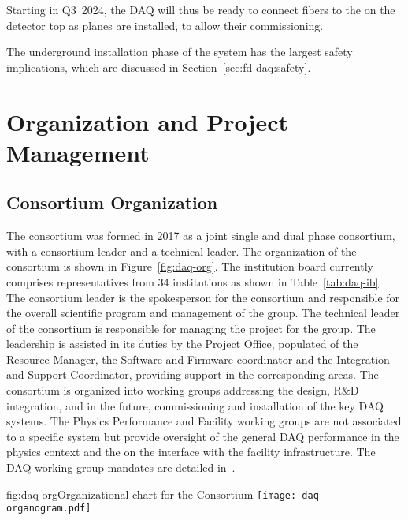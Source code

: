 Starting in Q3~2024, the DAQ will thus be ready to connect fibers to the
 on the detector top as planes are installed, to allow their commissioning.

The underground installation phase of the  system has the largest safety
implications, which are discussed in Section~\ref{sec:fd-daq:safety}.

\section{Organization and Project Management}
\label{sec:sp-daq:organization}


\subsection{Consortium Organization}

The  consortium was formed in 2017 as a joint single and
dual phase consortium, with a consortium leader and a technical
leader. The organization of the consortium is shown in
Figure~\ref{fig:daq-org}. The  institution board currently comprises
representatives from 34 institutions as shown in Table~\ref{tab:daq-ib}. The consortium leader is the spokesperson for the consortium and responsible for the overall scientific program and management of the group. The technical leader of the consortium is responsible for
managing the project for the group. The leadership is assisted in its duties by the Project Office, populated of the Resource Manager, the Software and Firmware coordinator and the Integration and Support Coordinator, providing support in the corresponding areas. 
The consortium is organized into working groups addressing the design, R\&D integration, and in the future, commissioning and installation of the key DAQ systems. The Physics Performance and Facility working groups are not associated to a specific system but provide oversight of the general DAQ performance in the physics context and the on the interface with the facility infrastructure. The DAQ working group mandates are detailed in~.

\begin{dunefigure}{fig:daq-org}{Organizational chart for the  Consortium
}
  \texttt{[image: daq-organogram.pdf]}
\end{dunefigure}

